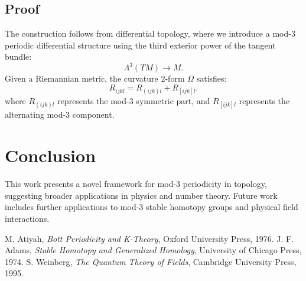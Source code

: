 \documentclass[a4paper,12pt]{article}
\begin{document}
\subsection{Proof}

The construction follows from differential topology, where we introduce a mod-3 periodic differential structure using the third exterior power of the tangent bundle:
\begin{equation}
\Lambda^3 (TM) \to M.
\end{equation}
Given a Riemannian metric, the curvature 2-form $\Omega$ satisfies:
\begin{equation}
R_{ijkl} = R_{(ijk)l} + R_{[ijk]l}.
\end{equation}
where $R_{(ijk)l}$ represents the mod-3 symmetric part, and $R_{[ijk]l}$ represents the alternating mod-3 component.

\section{Conclusion}
This work presents a novel framework for mod-3 periodicity in topology, suggesting broader applications in physics and number theory. Future work includes further applications to mod-3 stable homotopy groups and physical field interactions.

\begin{thebibliography}{9}
 M. Atiyah, \textit{Bott Periodicity and K-Theory}, Oxford University Press, 1976.
 J. F. Adams, \textit{Stable Homotopy and Generalized Homology}, University of Chicago Press, 1974.
 S. Weinberg, \textit{The Quantum Theory of Fields}, Cambridge University Press, 1995.
\end{thebibliography}
\end{document}
